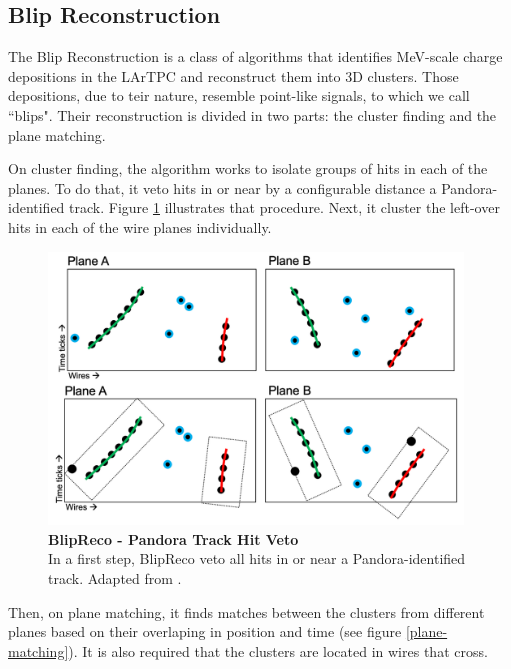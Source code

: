 \subsection{Blip Reconstruction}
The Blip Reconstruction is a class of algorithms that identifies MeV-scale charge depositions in the LArTPC and reconstruct them into 3D clusters. Those depositions, due to teir nature, resemble point-like signals, to which we call ``blips". Their reconstruction is divided in two parts: the cluster finding and the plane matching. 

On cluster finding, the algorithm works to isolate groups of hits in each of the planes. To do that, it veto hits in or near by a configurable distance a Pandora-identified track. Figure \ref{blip_track_veto} illustrates that procedure. Next, it cluster the left-over hits in each of the wire planes individually. 

\begin{figure}[h!]
    \centering
    \includegraphics[width=110mm]{Figures/blip_track_veto.png}
    \caption[BlipReco - Pandora Track Hit Veto]{{\textbf{BlipReco - Pandora Track Hit Veto}}\\ In a first step, BlipReco veto all hits in or near a Pandora-identified track. Adapted from \cite{will_CM_Aug}.}
    \label{blip_track_veto}
\end{figure}

Then, on plane matching, it finds matches between the clusters from different planes based on their overlaping in position and time (see figure \ref{plane-matching}). It is also required that the clusters are located in wires that cross. 

